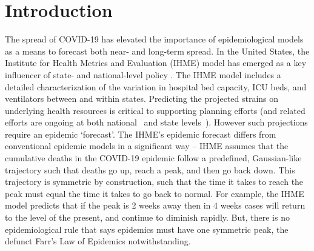 \section{Introduction}
The spread of COVID-19 has elevated the importance of epidemiological
models as a means to forecast both near- and long-term spread. 
In the United States, the Institute for Health Metrics and Evaluation (IHME)
model has emerged as a key influencer of state- and national-level
policy \citep{covid2020forecasting}.  The IHME model includes a detailed characterization
of the variation in
hospital bed capacity, ICU beds, and ventilators between and within
states. Predicting the projected strains on underlying
health resources
 is critical to supporting planning efforts (and related
efforts are ongoing at both national~\citep{meyers} and
state levels~\citep{upenn}).  However such projections require
an epidemic `forecast'.  The IHME's epidemic forecast
differs from conventional
epidemic models in a significant way -- IHME assumes
that the cumulative deaths in the COVID-19 epidemic
follow a predefined, Gaussian-like trajectory 
such that deaths go up, reach a peak,
and then go back down.  This trajectory is symmetric
by construction, such that the time it takes to reach the peak 
must equal the time it takes to go back to normal.  For example, the 
IHME model predicts that if the peak is 2 weeks away then in 4 weeks
cases will return to the level of the present, and continue
to diminish rapidly.  But, there is no epidemiological rule
that says epidemics must have one symmetric peak, 
the defunct Farr's Law of Epidemics notwithstanding. 

